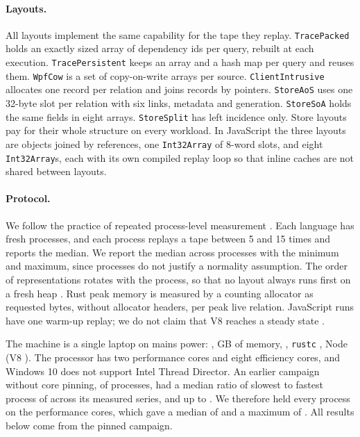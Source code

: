 \documentclass[11pt]{article}
\begin{document}
\paragraph{Layouts.} All layouts implement the same capability for the tape they replay. \texttt{TracePacked} holds an exactly sized array of dependency ids per query, rebuilt at each execution. \texttt{TracePersistent} keeps an array and a hash map per query and reuses them. \texttt{WpfCow} is a set of copy-on-write arrays per source. \texttt{ClientIntrusive} allocates one record per relation and joins records by pointers. \texttt{StoreAoS} uses one 32-byte slot per relation with six links, metadata and generation. \texttt{StoreSoA} holds the same fields in eight arrays. \texttt{StoreSplit} has left incidence only. Store layouts pay for their whole structure on every workload. In JavaScript the three layouts are objects joined by references, one \texttt{Int32Array} of 8-word slots, and eight \texttt{Int32Array}s, each with its own compiled replay loop so that inline caches are not shared between layouts.

\paragraph{Protocol.} We follow the practice of repeated process-level measurement \cite{georges2007,kalibera2013}. Each language has \rustRuns{} fresh processes, and each process replays a tape between 5 and 15 times and reports the median. We report the median across processes with the minimum and maximum, since \rustRuns{} processes do not justify a normality assumption. The order of representations rotates with the process, so that no layout always runs first on a fresh heap \cite{mytkowicz2009}. Rust peak memory is measured by a counting allocator as requested bytes, without allocator headers, per peak live relation. JavaScript runs have one warm-up replay; we do not claim that V8 reaches a steady state \cite{barrett2017}.

The machine is a single laptop on mains power: \cpuName{}, \memoryGb{} GB of memory, \osName{}, \texttt{rustc} \rustcVersion{}, Node \nodeVersion{} (V8 \veeEightVersion{}). The processor has two performance cores and eight efficiency cores, and Windows 10 does not support Intel Thread Director. An earlier campaign without core pinning, of \noiseUnpinnedRuns{} processes, had a median ratio of slowest to fastest process of \noiseUnpinnedMedian{} across its measured series, and up to \noiseUnpinnedMax{}. We therefore held every process on the performance cores, which gave a median of \noisePinnedMedian{} and a maximum of \noisePinnedMax{}. All results below come from the pinned campaign.
\end{document}
